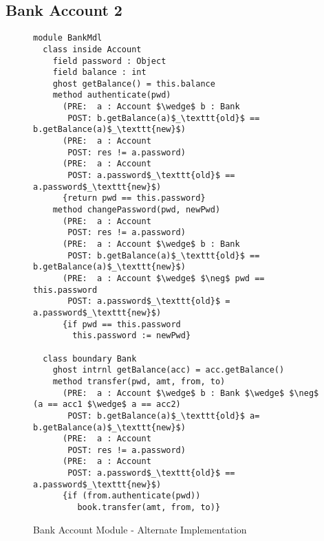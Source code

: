 \subsection{Bank Account 2}
\begin{figure}[t]
\begin{lstlisting}[mathescape=true, frame=lines]
module BankMdl
  class inside Account
    field password : Object
    field balance : int
    ghost getBalance() = this.balance
    method authenticate(pwd)
      (PRE:  a : Account $\wedge$ b : Bank
       POST: b.getBalance(a)$_\texttt{old}$ == b.getBalance(a)$_\texttt{new}$)
      (PRE:  a : Account
       POST: res != a.password)
      (PRE:  a : Account
       POST: a.password$_\texttt{old}$ == a.password$_\texttt{new}$)
      {return pwd == this.password}
    method changePassword(pwd, newPwd)
      (PRE:  a : Account
       POST: res != a.password)
      (PRE:  a : Account $\wedge$ b : Bank
       POST: b.getBalance(a)$_\texttt{old}$ == b.getBalance(a)$_\texttt{new}$)
      (PRE:  a : Account $\wedge$ $\neg$ pwd == this.password
       POST: a.password$_\texttt{old}$ = a.password$_\texttt{new}$)
      {if pwd == this.password
        this.password := newPwd}      

  class boundary Bank
    ghost intrnl getBalance(acc) = acc.getBalance()
    method transfer(pwd, amt, from, to)
      (PRE:  a : Account $\wedge$ b : Bank $\wedge$ $\neg$ (a == acc1 $\wedge$ a == acc2)
       POST: b.getBalance(a)$_\texttt{old}$ a= b.getBalance(a)$_\texttt{new}$)
      (PRE:  a : Account
       POST: res != a.password)
      (PRE:  a : Account
       POST: a.password$_\texttt{old}$ == a.password$_\texttt{new}$)
      {if (from.authenticate(pwd))
         book.transfer(amt, from, to)}
\end{lstlisting}
\caption{Bank Account Module - Alternate Implementation}
\label{f:ex-bank2}
\end{figure}



